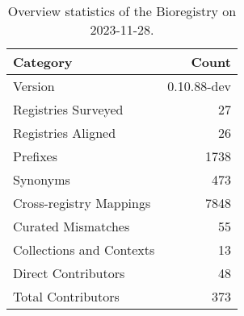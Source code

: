 \begin{table}
\caption{Overview statistics of the Bioregistry on 2023-11-28.}
\label{tab:bioregistry-summary}
\begin{tabular}{lr}
\toprule
Category & Count \\
\midrule
Version & 0.10.88-dev \\
Registries Surveyed & 27 \\
Registries Aligned & 26 \\
Prefixes & 1738 \\
Synonyms & 473 \\
Cross-registry Mappings & 7848 \\
Curated Mismatches & 55 \\
Collections and Contexts & 13 \\
Direct Contributors & 48 \\
Total Contributors & 373 \\
\bottomrule
\end{tabular}
\end{table}
